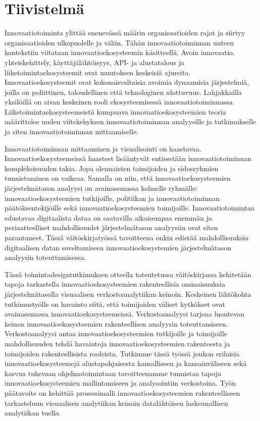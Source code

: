 \chapter{Tiivistelmä}

Innovaatiotoiminta ylittää enenevässä määrin organisaatioiden rajat ja siirtyy organisaatioiden ulkopuolelle ja väliin. Tähän innovaatiotoiminnan uuteen kontekstiin viitataan innovaatioekosysteemin käsitteellä. Avoin innovaatio, yhteiskehittely, käyttäjälähtöisyys, API- ja alustatalous ja liiketoimintaekosysteemit ovat muutoksen keskeisiä ajureita.  Innovaatioekosysteemit ovat kokonaisvaltaisia avoimia dynaamisia järjestelmiä, joilla on poliittinen, taloudellinen että teknologinen ulottuvuus. Lahjakkailla yksilöillä on aivan keskeinen rooli ekosysteemisessä innovaatiotoiminnassa. Liiketoimintaekosysteemeistä kumpuava innovaatioekosysteemien teoria määrittelee uuden viitekehyksen innovaatiotoiminnan analyysille ja tutkimukselle ja siten innovaatiotoiminnan mittaamiselle. 

Innovaatiotoiminnan mittaaminen ja visualisointi on haastavaa. Innovaatioekosysteemeissä haasteet lisääntyvät entisestään innovaatiotoiminnan kompleksisuuden takia. Jopa olennaisten toimijoiden ja sidosryhmien tunnistaminen on vaikeaa. Samalla on niin, että innovaatioekosysteemien järjestelmätason analyysi on avainasemassa kolmelle ryhmälle: innovaatioekosysteemien tutkijoille, politiikan ja innovaatiotoiminnan päätöksentekijöille sekä innovaatioekosysteemien toimijoille. Innovaatiotoimintaa edustavaa digitaalista dataa on saatavilla aikaisempaa enemmän ja periaatteelliset mahdollisuudet järjestelmätason analyysiin ovat siten parantuneet. Tässä väitöskirjatyössä tavoitteena onkin edistää mahdollisuuksia digitaalisen datan soveltamiseen innovaatioekosystemien järjestelmätason analyysin toteuttamisessa. 

Tässä toimintadesigntutkimuksen otteella toteutetussa väitöskirjassa kehitetään tapoja tarkastella innovaatioekosysteemien rakenteellisia ominaisuuksia järjestelmätasolla visuaalisen verkostoanalytiikan keinoin. Keskeinen lähtökohta tutkimustyölle on havainto siitä, että  toimijoiden väliset kytkökset ovat avainasemassa innovaatioekosysteemeissä. Verkostoanalyysi tarjoaa luontevan keinon innovaatioekosysteemien rakenteellisen analyysin toteuttamiseen. Verkostoanalyysi antaa innovaatioekosysteemien tutkijoille ja toimijoille mahdollisuuden tehdä havaintoja innovaatioekosysteemien rakenteesta ja toimijoiden rakenteellisista rooleista. Tutkimme tässä työssä joukon erilaisia innovaatioekosysteemejä alustapohjaisesta kansalliseen ja kansainväliseen sekä kasvua tukevaan ohjelmatoimintaan tavoitteenamme tunnistaa tapoja innovaatioekosysteemien mallintamiseen ja analysointiin verkostoina. Työn päätavoite on kehittää prosessimalli innovaatioekosysteemien rakenteelliseen tarkasteluun visuaalisen analytiikan keinoin  datalähtöisen laskennallisen analytiikan tuella. 

